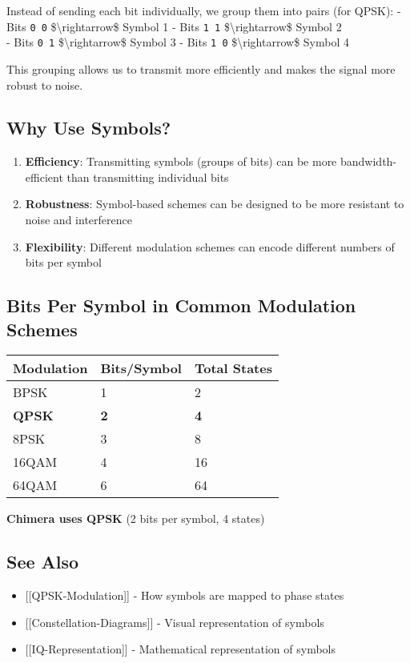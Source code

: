 Instead of sending each bit individually, we group them into pairs (for
QPSK): - Bits \texttt{0\ 0} \$\textbackslash rightarrow\$ Symbol 1 -
Bits \texttt{1\ 1} \$\textbackslash rightarrow\$ Symbol 2\\
- Bits \texttt{0\ 1} \$\textbackslash rightarrow\$ Symbol 3 - Bits
\texttt{1\ 0} \$\textbackslash rightarrow\$ Symbol 4

This grouping allows us to transmit more efficiently and makes the
signal more robust to noise.

\subsection{Why Use Symbols?}\label{why-use-symbols}

\begin{enumerate}
\def\labelenumi{\arabic{enumi}.}
\tightlist
\item
  \textbf{Efficiency}: Transmitting symbols (groups of bits) can be more
  bandwidth-efficient than transmitting individual bits
\item
  \textbf{Robustness}: Symbol-based schemes can be designed to be more
  resistant to noise and interference
\item
  \textbf{Flexibility}: Different modulation schemes can encode
  different numbers of bits per symbol
\end{enumerate}

\subsection{Bits Per Symbol in Common Modulation
Schemes}\label{bits-per-symbol-in-common-modulation-schemes}

{\def\LTcaptype{} %
\begin{longtable}[]{@{}lll@{}}
\toprule\noalign{}
Modulation & Bits/Symbol & Total States \\
\midrule\noalign{}
\endhead
\bottomrule\noalign{}
\endlastfoot
BPSK & 1 & 2 \\
\textbf{QPSK} & \textbf{2} & \textbf{4} \\
8PSK & 3 & 8 \\
16QAM & 4 & 16 \\
64QAM & 6 & 64 \\
\end{longtable}
}

\textbf{Chimera uses QPSK} (2 bits per symbol, 4 states)

\subsection{See Also}\label{see-also}

\begin{itemize}
\tightlist
\item
  {[}{[}QPSK-Modulation{]}{]} - How symbols are mapped to phase states
\item
  {[}{[}Constellation-Diagrams{]}{]} - Visual representation of symbols
\item
  {[}{[}IQ-Representation{]}{]} - Mathematical representation of symbols
\end{itemize}
